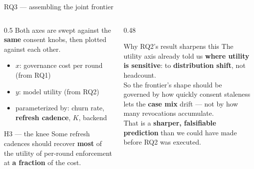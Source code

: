 \documentclass[aspectratio=169, 11pt]{beamer}
\begin{document}
\begin{frame}{RQ3 --- assembling the joint frontier}
\begin{columns}[T]
\begin{column}{0.5\textwidth}
Both axes are swept against the \textbf{same} consent knobs, then plotted
against each other.
\vspace{0.4em}
\begin{itemize}\small
\item $x$: governance cost per round (from RQ1)
\item $y$: model utility (from RQ2)
\item parameterized by: churn rate, \textbf{refresh cadence}, $K$, backend
\end{itemize}
\vspace{0.4em}
\begin{alertblock}{H3 --- the knee}
Some refresh cadences should recover \textbf{most} of the utility of
per-round enforcement at \textbf{a fraction} of the cost.
\end{alertblock}
\end{column}
\begin{column}{0.48\textwidth}
\begin{exampleblock}{Why RQ2's result sharpens this}
The utility axis already told us \textbf{where utility is sensitive}: to
\textbf{distribution shift}, not headcount.\\[0.5em]
So the frontier's shape should be governed by how quickly consent staleness
lets the \textbf{case mix} drift --- not by how many revocations accumulate.\\[0.5em]
That is a \textbf{sharper, falsifiable prediction} than we could have made
before RQ2 was executed.
\end{exampleblock}
\end{column}
\end{columns}
\end{frame}
\end{document}

